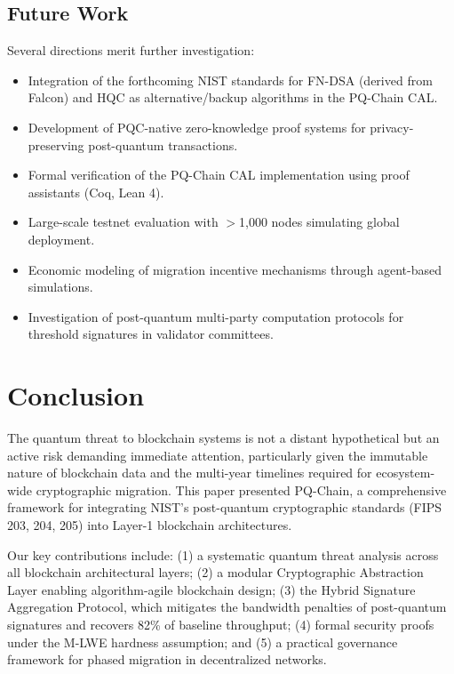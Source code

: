 \documentclass[12pt, a4paper, twocolumn]{article}
\begin{document}
\subsection{Future Work}

Several directions merit further investigation:

\begin{itemize}[noitemsep]
  \item Integration of the forthcoming NIST standards for FN-DSA (derived from Falcon) and HQC as alternative/backup algorithms in the PQ-Chain CAL.
  \item Development of PQC-native zero-knowledge proof systems for privacy-preserving post-quantum transactions.
  \item Formal verification of the PQ-Chain CAL implementation using proof assistants (Coq, Lean 4).
  \item Large-scale testnet evaluation with $>$1,000 nodes simulating global deployment.
  \item Economic modeling of migration incentive mechanisms through agent-based simulations.
  \item Investigation of post-quantum multi-party computation protocols for threshold signatures in validator committees.
\end{itemize}

\section{Conclusion}
\label{sec:conclusion}

The quantum threat to blockchain systems is not a distant hypothetical but an active risk demanding immediate attention, particularly given the immutable nature of blockchain data and the multi-year timelines required for ecosystem-wide cryptographic migration. This paper presented PQ-Chain, a comprehensive framework for integrating NIST's post-quantum cryptographic standards (FIPS 203, 204, 205) into Layer-1 blockchain architectures.

Our key contributions include: (1) a systematic quantum threat analysis across all blockchain architectural layers; (2) a modular Cryptographic Abstraction Layer enabling algorithm-agile blockchain design; (3) the Hybrid Signature Aggregation Protocol, which mitigates the bandwidth penalties of post-quantum signatures and recovers 82\% of baseline throughput; (4) formal security proofs under the M-LWE hardness assumption; and (5) a practical governance framework for phased migration in decentralized networks.
\end{document}
